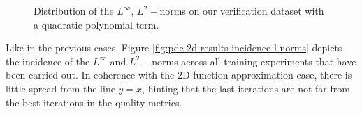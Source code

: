 \documentclass[12pt]{report} %
\begin{document}
\begin{figure}
\begin{tabular}{cccccc}
  \end{tabular}
  \caption{Distribution of the $L^\infty$, $L^2-$norms on our verification dataset
    with a quadratic polynomial term.}
  \label{fig:2d-pde-parabola-results-poly2}
\end{figure}



Like in the previous cases, Figure \ref{fig:pde-2d-results-incidence-l-norms} depicts the incidence of the $L^\infty$ and $L^2-$norms across all training experiments that have been carried out. In coherence with the 2D function approximation case, there is little spread from the line $y=x$, hinting that the last iterations are not far from the best iterations in the quality metrics.
\end{document}

